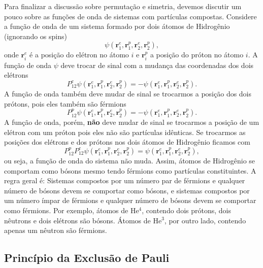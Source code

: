 \documentclass{article}
\begin{document}
Para finalizar a discussão sobre permutação e simetria, devemos discutir um pouco sobre as funções de onda de sistemas com partículas compostas. Considere a função de onda de um sistema formado por dois átomos de Hidrogênio (ignorando os spins)
\begin{equation}
    \psi(\mathbf{r}^e_1,\mathbf{r}^p_1,\mathbf{r}^e_2,\mathbf{r}^p_2),
\end{equation}
onde $\mathbf{r}^e_i$ é a posição do elétron no átomo $i$ e $\mathbf{r}^p_i$ a posição do próton no átomo $i$. A função de onda $\psi$ deve trocar de sinal com a mudança das coordenadas dos dois elétrons
\begin{equation}
    P_{12}^e \psi(\mathbf{r}^e_1,\mathbf{r}^p_1,\mathbf{r}^e_2,\mathbf{r}^p_2) = -\psi(\mathbf{r}^e_1,\mathbf{r}^p_1,\mathbf{r}^e_2,\mathbf{r}^p_2).
\end{equation}
A função de onda também deve mudar de sinal se trocarmos a posição dos dois prótons, pois eles também são férmions
\begin{equation}
    P_{12}^p \psi(\mathbf{r}^e_1,\mathbf{r}^p_1,\mathbf{r}^e_2,\mathbf{r}^p_2) = -\psi(\mathbf{r}^e_1,\mathbf{r}^p_1,\mathbf{r}^e_2,\mathbf{r}^p_2).
\end{equation}
A função de onda, porém, \textbf{não} deve mudar de sinal se trocarmos a posição de um elétron com um próton pois eles não são partículas idênticas. Se trocarmos as posições dos elétrons e dos prótons nos dois átomos de Hidrogênio ficamos com
\begin{equation}
    P_{12}^p P_{12}^e \psi(\mathbf{r}^e_1,\mathbf{r}^p_1,\mathbf{r}^e_2,\mathbf{r}^p_2) = \psi(\mathbf{r}^e_1,\mathbf{r}^p_1,\mathbf{r}^e_2,\mathbf{r}^p_2),
\end{equation}
ou seja, a função de onda do sistema não muda. Assim, átomos de Hidrogênio se comportam como bósons mesmo tendo férmions como partículas constituintes. A regra geral é: Sistemas compostos por um número par de férmions e qualquer número de bósons devem se comportar como bósons, e sistemas compostos por um número ímpar de férmions e qualquer número de bósons devem se comportar como férmions. Por exemplo, átomos de He$^4$, contendo dois prótons, dois nêutrons e dois elétrons são bósons. Átomos de He$^3$, por outro lado, contendo apenas um nêutron são férmions.

\subsection{Princípio da Exclusão de Pauli}
\end{document}

